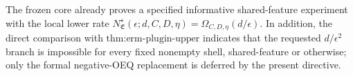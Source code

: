 The frozen core already proves a specified informative shared-feature experiment with the local lower rate \(N^\star_{\mathfrak E}(\epsilon;d,C,D,\eta)=\Omega_{C,D,\eta}(d/\epsilon)\). In addition, the direct comparison with \(\text{thm:erm-plugin-upper}\) indicates that the requested \(d/\epsilon^2\) branch is impossible for every fixed nonempty shell, shared-feature or otherwise; only the formal negative-OEQ replacement is deferred by the present directive.